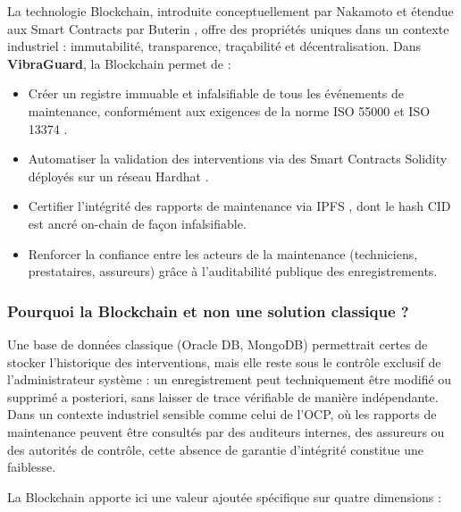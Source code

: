 \documentclass[12pt, a4paper, oneside]{report}
\newcommand{\projectname}{\textbf{VibraGuard}}
\begin{document}
La technologie Blockchain, introduite conceptuellement par Nakamoto \cite{nakamoto2008}
et étendue aux Smart Contracts par Buterin \cite{buterin2014}, offre des propriétés uniques
dans un contexte industriel : immutabilité, transparence, traçabilité et décentralisation.
Dans \projectname{}, la Blockchain permet de :

\begin{itemize}
  \item Créer un registre immuable et infalsifiable de tous les événements de maintenance,
  conformément aux exigences de la norme ISO 55000 \cite{iso55000} et ISO 13374 \cite{iso13374}.
  \item Automatiser la validation des interventions via des Smart Contracts Solidity déployés
  sur un réseau Hardhat \cite{hardhat}.
  \item Certifier l'intégrité des rapports de maintenance via IPFS \cite{ipfs}, dont le hash
  CID est ancré on-chain de façon infalsifiable.
  \item Renforcer la confiance entre les acteurs de la maintenance (techniciens, prestataires,
  assureurs) grâce à l'auditabilité publique des enregistrements.
\end{itemize}

\subsubsection*{Pourquoi la Blockchain et non une solution classique ?}

Une base de données classique (Oracle DB, MongoDB) permettrait
certes de stocker l'historique des interventions, mais elle reste sous le contrôle
exclusif de l'administrateur système : un enregistrement peut techniquement être
modifié ou supprimé a posteriori, sans laisser de trace vérifiable de manière
indépendante. Dans un contexte industriel sensible comme celui de l'OCP, où les
rapports de maintenance peuvent être consultés par des auditeurs internes, des
assureurs ou des autorités de contrôle, cette absence de garantie d'intégrité
constitue une faiblesse.

La Blockchain apporte ici une valeur ajoutée spécifique sur quatre dimensions :
\end{document}
